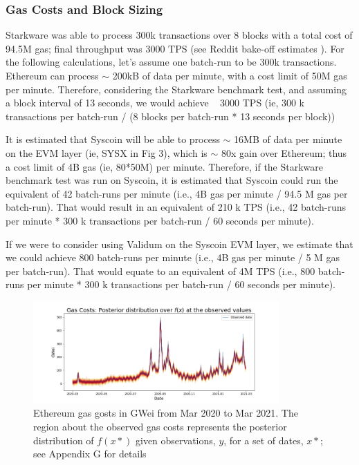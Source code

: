 \documentclass[peerreview]{ieeesyscoin}
\begin{document}
\subsubsection{Gas Costs and Block Sizing}

Starkware was able to process 300k transactions over 8 blocks with a total cost of 94.5M gas; final throughput was 3000 TPS (see Reddit bake-off estimates \cite{Sta20b}). For the following calculations, let’s assume one batch-run to be 300k transactions. Ethereum can process $\sim$ 200kB of data per minute, with a cost limit of 50M gas per minute. Therefore, considering the Starkware benchmark test, and assuming a block interval of 13 seconds, we would achieve ~ 3000 TPS (ie,  300 k transactions per batch-run / (8 blocks per batch-run * 13 seconds per block))

It is estimated that Syscoin will be able to process $\sim$ 16MB of data per minute on the EVM layer (ie, SYSX in Fig 3), which is $\sim$ 80x gain over Ethereum; thus a cost limit of 4B gas (ie, 80*50M) per minute. Therefore, if the Starkware benchmark test was run on Syscoin, it is estimated that Syscoin could run the equivalent of 42 batch-runs per minute (i.e., 4B gas per minute / 94.5 M gas per batch-run). That would result in an equivalent of 210 k TPS (i.e., 42 batch-runs per minute * 300 k transactions per batch-run / 60 seconds per minute).

If we were to consider using Validum on the Syscoin EVM layer, we estimate that we could achieve 800 batch-runs per minute (i.e., 4B gas per minute / 5 M gas per batch-run). That would equate to an equivalent of 4M TPS (i.e., 800 batch-runs per minute * 300 k transactions per batch-run / 60 seconds per minute).

\begin{figure}[h!]
\includegraphics[width=3.7in]{img/eth_gas_costs.png}
\caption{Ethereum gas gosts in GWei from Mar 2020 to Mar 2021. The region about the observed gas costs represents the posterior distribution of $f(x*)$ given observations, $y$, for a set of dates, $x*$; see Appendix G for details}  
\label{fig:eth_gas_costs}
\end{figure} 
\end{document}
